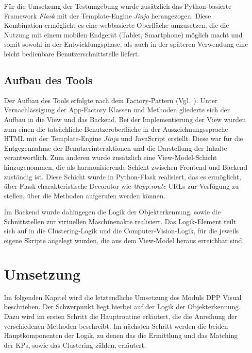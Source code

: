 \documentclass[
    type=Prakikumsbericht,
    status=draft, %
    language=german, %
    bibengine=bibtex,
]{unibwm-inf-thesis}
\begin{document}
    Für die Umsetzung der Testumgebung wurde zusätzlich das Python-basierte Framework \textit{Flask} mit der
    Template-Engine \textit{Jinja} herangezogen.
    Diese Kombination ermöglicht es eine webbasierte Oberfläche umzusetzen, die die Nutzung mit einem mobilen Endgerät
    (Tablet, Smartphone) möglich macht und somit sowohl in der Entwicklungsphase, als auch in der späteren Verwendung eine leicht bedienbare Benutzerschnittstelle liefert.

    \subsection{Aufbau des Tools} \label{subsec:aufbau-des-tools}
    Der Aufbau des Tools erfolgte nach dem Factory-Pattern (Vgl.~\citep{FlaskDevelopero.J.}).
    Unter Vernachlässigung der App-Factory Klassen und Methoden gliederte sich der Aufbau in die View und das Backend.
    Bei der Implementierung der View wurden zum einen die tatsächliche Benutzeroberfläche in der Auszeichnungssprache
    HTML mit der Template-Engine \textit{Jinja} und JavaScript erstellt.
    Diese war für die Entgegennahme der Benutzerinteraktionen und die Darstellung der Inhalte verantwortlich.
    Zum anderen wurde zusätzlich eine View-Model-Schicht hinzugenommen, die als harmonisierende Schicht zwischen
    Frontend und Backend zuständig ist.
    Diese Schicht wurde in Python-Flask realisiert, das es ermöglicht, über Flask-charakteristische Decorator wie
    \textit{@app.route} URLs zur Verfügung zu stellen, über die Methoden aufgerufen werden können.

    Im Backend wurde dahingegen die Logik der Objekterkennung, sowie die Schnittstellen zur virtuellen Maschinenakte realisiert.
    Das Logik-Element teilt sich auf in die Clustering-Logik und die Computer-Vision-Logik, für die jeweils eigene
    Skripte angelegt wurden, die aus dem View-Model heraus erreichbar sind.

    \section{Umsetzung}
    Im folgenden Kapitel wird die letztendliche Umsetzung des Moduls \ac{DPP} Visual beschrieben.
    Der Schwerpunkt liegt hierbei auf der Logik der Objekterkennung.
    Dazu wird im ersten Schritt die Hauptroutine erläutert, die die Anreihung der verschiedenen Methoden beschreibt.
    Im nächsten Schritt werden die beiden Hauptkomponenten der Logik, zu denen das die Ermittlung und das Matching der \acp{KP}, sowie das Clustering zählen, erläutert.
\end{document}
